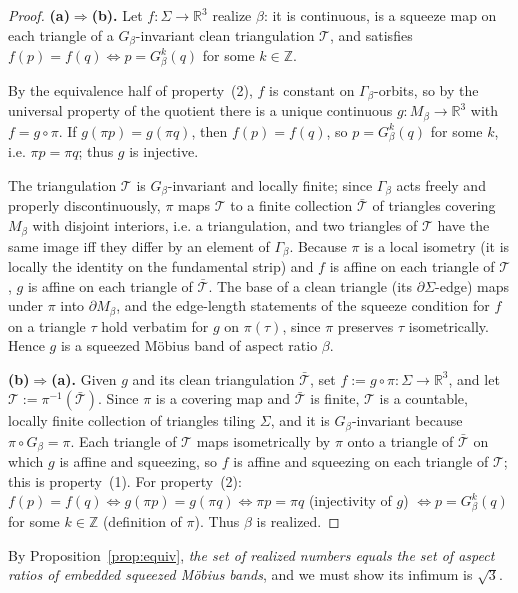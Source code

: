 \documentclass[11pt]{article}
\theoremstyle{definition}
\newcommand{\Z}{\mathbb{Z}}
\newcommand{\R}{\mathbb{R}}
\newcommand{\Sg}{\Sigma}
\newcommand{\bd}{\partial}
\begin{document}
\begin{proof}
\textbf{(a)$\Rightarrow$(b).} Let $f:\Sg\to\R^3$ realize $\beta$: it is continuous, is a
squeeze map on each triangle of a $G_\beta$-invariant clean triangulation $\mathcal T$, and
satisfies $f(p)=f(q)\iff p=G_\beta^k(q)$ for some $k\in\Z$.

By the equivalence half of property~(2), $f$ is constant on $\Gamma_\beta$-orbits, so by the
universal property of the quotient there is a unique continuous $g:M_\beta\to\R^3$ with
$f=g\circ\pi$. If $g(\pi p)=g(\pi q)$, then $f(p)=f(q)$, so $p=G_\beta^k(q)$ for some $k$,
i.e. $\pi p=\pi q$; thus $g$ is injective.

The triangulation $\mathcal T$ is $G_\beta$-invariant and locally finite; since
$\Gamma_\beta$ acts freely and properly discontinuously, $\pi$ maps $\mathcal T$ to a finite
collection $\bar{\mathcal T}$ of triangles covering $M_\beta$ with disjoint interiors, i.e.
a triangulation, and two triangles of $\mathcal T$ have the same image iff they differ by an
element of $\Gamma_\beta$. Because $\pi$ is a local isometry (it is locally the identity on
the fundamental strip) and $f$ is affine on each triangle of $\mathcal T$, $g$ is affine on
each triangle of $\bar{\mathcal T}$. The base of a clean triangle (its $\bd\Sg$-edge) maps
under $\pi$ into $\bd M_\beta$, and the edge-length statements of the squeeze condition for
$f$ on a triangle $\tau$ hold verbatim for $g$ on $\pi(\tau)$, since $\pi$ preserves
$\tau$ isometrically. Hence $g$ is a squeezed M\"obius band of aspect ratio $\beta$.

\textbf{(b)$\Rightarrow$(a).} Given $g$ and its clean triangulation $\bar{\mathcal T}$, set
$f:=g\circ\pi:\Sg\to\R^3$, and let $\mathcal T:=\pi^{-1}(\bar{\mathcal T})$. Since $\pi$ is a
covering map and $\bar{\mathcal T}$ is finite, $\mathcal T$ is a countable, locally finite
collection of triangles tiling $\Sg$, and it is $G_\beta$-invariant because
$\pi\circ G_\beta=\pi$. Each triangle of $\mathcal T$ maps isometrically by $\pi$ onto a
triangle of $\bar{\mathcal T}$ on which $g$ is affine and squeezing, so $f$ is affine and
squeezing on each triangle of $\mathcal T$; this is property~(1). For property~(2):
$f(p)=f(q)\iff g(\pi p)=g(\pi q)\iff \pi p=\pi q$ (injectivity of $g$) $\iff p=G_\beta^k(q)$
for some $k\in\Z$ (definition of $\pi$). Thus $\beta$ is realized.
\end{proof}

By Proposition~\ref{prop:equiv}, \emph{the set of realized numbers equals the set of
aspect ratios of embedded squeezed M\"obius bands}, and we must show its infimum is $\sqrt3$.
\end{document}
